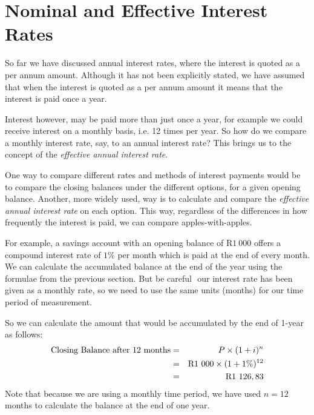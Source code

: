 \section{Nominal and Effective Interest Rates}
\label{m:f11:nominal}

So far we have discussed annual interest rates, where the interest is quoted as a per annum amount. Although it has not been explicitly stated, we have assumed that when the interest is quoted as a per annum amount it means that the interest is paid once a year.

Interest however, may be paid more than just once a year, for example we could receive interest on a monthly basis, i.e. 12 times per year. So how do we compare a monthly interest rate, say, to an annual interest rate? This brings us to the concept of the \textit{effective annual interest rate}.

One way to compare different rates and methods of interest payments would be to compare the closing balances under the different options, for a given opening balance. Another, more widely used, way is to calculate and compare the \textit{effective annual interest rate} on each option. This way, regardless of the differences in how frequently the interest is paid, we can compare apples-with-apples.

For example, a savings account with an opening balance of R$1~000$ offers a compound interest rate of $1\%$ per month which is paid at the end of every month. We can calculate the accumulated balance at the end of the year using the formulae from the previous section. But be careful  our interest rate has been given as a monthly rate, so we need to use the same units (months) for our time period of measurement.


So we can calculate the amount that would be accumulated by the end of 1-year as follows:
\begin{eqnarray*}
\mbox{Closing Balance after 12 months}&=& P \times (1 + i)^n \\
&=& \rm{R}1~000 \times (1 + 1\%)^{12} \\
&=& \rm{R}1~126,83
\end{eqnarray*}
Note that because we are using a monthly time period, we have used $n=12$ months to calculate the balance at the end of one year.

